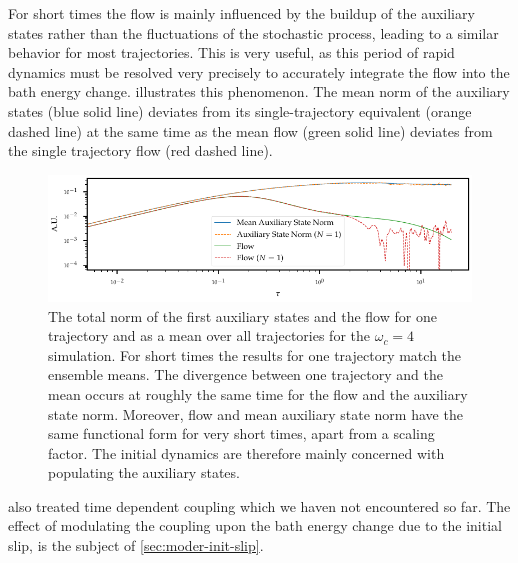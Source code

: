 For short times the flow is mainly influenced by the buildup of the
auxiliary states rather than the fluctuations of the stochastic
process, leading to a similar behavior for most trajectories.  This is
very useful, as this period of rapid dynamics must be resolved very
precisely to accurately integrate the flow into the bath energy
change.   illustrates this phenomenon. The mean
norm of the auxiliary states (blue solid line) deviates from its
single-trajectory equivalent (orange dashed line) at the same time as the
mean flow (green solid line) deviates from the single trajectory flow
(red dashed line).
\begin{figure}[htp]
  \centering
  \includegraphics{figs/one_bath_syst/flow_buildup}
  \caption{\label{fig:flow_buildup} The total norm of the first
    auxiliary states and the flow for one trajectory and as a mean
    over all trajectories for the \(ω_{c}=4\) simulation. For short
    times the results for one trajectory match the ensemble means. The
    divergence between one trajectory and the mean occurs at
    roughly the same time for the flow and the auxiliary state
    norm. Moreover, flow and mean auxiliary state norm have the same
    functional form for very short times, apart from a scaling
    factor. The initial dynamics are therefore mainly concerned with
    populating the auxiliary states.}
\end{figure}

 also treated time dependent coupling which we
haven not encountered so far. The effect of modulating the coupling
upon the bath energy change due to the initial slip, is the subject of
\cref{sec:moder-init-slip}.


